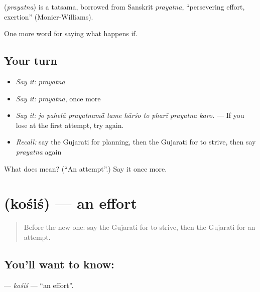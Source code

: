 \begin{cousinweb}
\textbf{} (\emph{prayatna}) is a tatsama, borrowed from Sanskrit \emph{prayatna}, \textquotedblleft{}persevering effort, exertion\textquotedblright{} (Monier-Williams).
\end{cousinweb}

\begin{grammarlens}[title={What you've built}]
One more word for saying what happens if.
\end{grammarlens}

\subsection*{Your turn}
\begin{itemize}
\raggedright
  \item \emph{Say it:} \emph{prayatna}
  \item \emph{Say it:} \emph{prayatna}, once more
  \item \emph{Say it:} \emph{jo pahelā prayatnamā̃ tame hārśo to pharī prayatna karo.} — If you lose at the first attempt, try again.
  \item \emph{Recall:} say the Gujarati for planning, then the Gujarati for to strive, then say \emph{prayatna} again
\end{itemize}

\begin{tcolorbox}[breakable,colback=teal!4,colframe=teal!35!black,title={Before you move on}]
What does  mean? (\textquotedblleft{}An attempt\textquotedblright{}.) Say it once more.
\end{tcolorbox}
\section[\texorpdfstring{\gu{કોશિશ} (kośiś)}{કોશિશ (kośiś)}]{ (kośiś) — an effort}

\label{lesson:GU-C383-kosis}



\begin{quote}
Before the new one: say the Gujarati for to strive, then the Gujarati for an attempt.
\end{quote}

\subsection*{You'll want to know: }
\textbf{} — \emph{kośiś} — \textquotedblleft{}an effort\textquotedblright{}.

